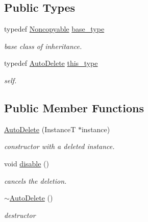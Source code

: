 \subsection*{Public Types}
\begin{DoxyCompactItemize}
\item 
\hypertarget{classhryky_1_1_auto_delete_a046a60ad465f3c9546be9c5f75bae542}{typedef \hyperlink{classhryky_1_1_noncopyable}{Noncopyable} \hyperlink{classhryky_1_1_auto_delete_a046a60ad465f3c9546be9c5f75bae542}{base\-\_\-type}}\label{classhryky_1_1_auto_delete_a046a60ad465f3c9546be9c5f75bae542}

\begin{DoxyCompactList}\small\item\em base class of inheritance. \end{DoxyCompactList}\item 
\hypertarget{classhryky_1_1_auto_delete_aae29dd8e7906c2000fae094e3da5360c}{typedef \hyperlink{classhryky_1_1_auto_delete}{Auto\-Delete} \hyperlink{classhryky_1_1_auto_delete_aae29dd8e7906c2000fae094e3da5360c}{this\-\_\-type}}\label{classhryky_1_1_auto_delete_aae29dd8e7906c2000fae094e3da5360c}

\begin{DoxyCompactList}\small\item\em self. \end{DoxyCompactList}\end{DoxyCompactItemize}
\subsection*{Public Member Functions}
\begin{DoxyCompactItemize}
\item 
\hyperlink{classhryky_1_1_auto_delete_ac25a04d5b8fcc449def4a1e5bf6fba5b}{Auto\-Delete} (Instance\-T $\ast$instance)
\begin{DoxyCompactList}\small\item\em constructor with a deleted instance. \end{DoxyCompactList}\item 
\hypertarget{classhryky_1_1_auto_delete_acd5b8c66807b7eb7bd60e943e06ad899}{void \hyperlink{classhryky_1_1_auto_delete_acd5b8c66807b7eb7bd60e943e06ad899}{disable} ()}\label{classhryky_1_1_auto_delete_acd5b8c66807b7eb7bd60e943e06ad899}

\begin{DoxyCompactList}\small\item\em cancels the deletion. \end{DoxyCompactList}\item 
\hypertarget{classhryky_1_1_auto_delete_a23a4916d0f5df04a5ce8840cb5c6a156}{\hyperlink{classhryky_1_1_auto_delete_a23a4916d0f5df04a5ce8840cb5c6a156}{$\sim$\-Auto\-Delete} ()}\label{classhryky_1_1_auto_delete_a23a4916d0f5df04a5ce8840cb5c6a156}

\begin{DoxyCompactList}\small\item\em destructor \end{DoxyCompactList}\end{DoxyCompactItemize}
